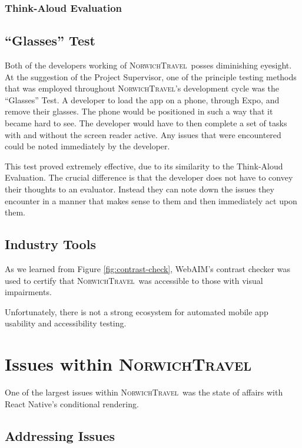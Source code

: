 \documentclass[cmpstyle]{ueacmpstyle}
\newcommand{\nt}{\textsc{NorwichTravel}}
\begin{document}
			\subsubsection{Think-Aloud Evaluation} \label{sec:think}
			
		\subsection{``Glasses'' Test} \label{sec:glasses}
		Both of the developers working of \nt \ posses diminishing eyesight. At the suggestion of the Project Supervisor, one of the principle testing methods that was employed throughout \nt's development cycle was the ``Glasses'' Test. A developer to load the app on a phone, through Expo, and remove their glasses. The phone would be positioned in such a way that it became hard to see. The developer would have to then complete a set of tasks with and without the screen reader active. Any issues that were encountered could be noted immediately by the developer. 
		
		This test proved extremely effective, due to its similarity to the Think-Aloud Evaluation. The crucial difference is that the developer does not have to convey their thoughts to an evaluator. Instead they can note down the issues they encounter in a manner that makes sense to them and then immediately act upon them. 
		
		\subsection{Industry Tools} \label{sec:industry-tools}
		As we learned from Figure \ref{fig:contrast-check}, WebAIM's contrast checker was used to certify that \nt \ was accessible to those with visual impairments. 
		
		Unfortunately, there is not a strong ecosystem for automated mobile app usability and accessibility testing. 
		
	\section{Issues within \nt} \label{sec:major}
	One of the largest issues within \nt \ was the state of affairs with React Native's conditional rendering. 
			
		\subsection{Addressing Issues} \label{sec:address}
			
\end{document}
